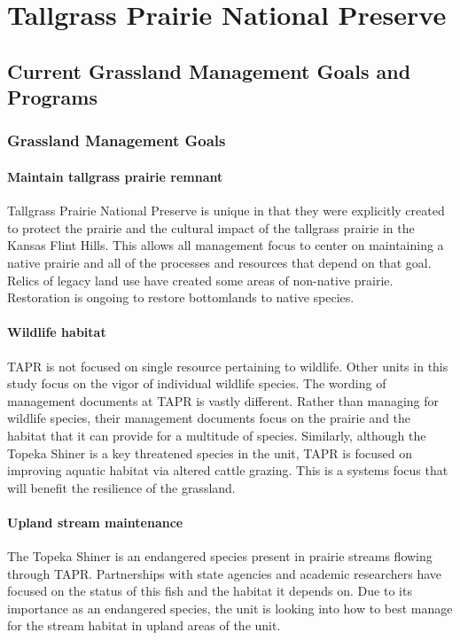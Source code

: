 \section{Tallgrass Prairie National Preserve}

\subsection{Current Grassland Management Goals and Programs}

\subsubsection{Grassland Management Goals}

\paragraph{Maintain tallgrass prairie remnant} 
Tallgrass Prairie National Preserve is unique in that they were explicitly created to protect the prairie and the cultural impact of the tallgrass prairie in the Kansas Flint Hills. 
This allows all management focus to center on maintaining a native prairie and all of the processes and resources that depend on that goal. 
Relics of legacy land use have created some areas of non-native prairie.
Restoration is ongoing to restore bottomlands to native species.

\paragraph{Wildlife habitat} 
TAPR is not focused on single resource pertaining to wildlife. 
Other units in this study focus on the vigor of individual wildlife species.
The wording of management documents at TAPR is vastly different. 
Rather than managing for wildlife species, their management documents focus on the prairie and the habitat that it can provide for a multitude of species.
Similarly, although the Topeka Shiner is a key threatened species in the unit, TAPR is focused on improving aquatic habitat via altered cattle grazing. 
This is a systems focus that will benefit the resilience of the grassland.

\paragraph{Upland stream maintenance} 
The Topeka Shiner is an endangered species present in prairie streams flowing through TAPR. 
Partnerships with state agencies and academic researchers have focused on the status of this fish and the habitat it depends on. 
Due to its importance as an endangered species, the unit is looking into how to best manage for the stream habitat in upland areas of the unit.

